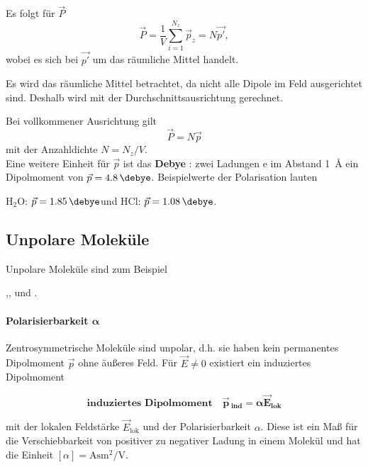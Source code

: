 
    Es folgt für $\vec{P}$
    \begin{equation}
    	\label{2.5}
    	\vec{P} = \frac{1}{V} \sum_{i = 1}^{N_{z}} \vec{p}_{z}= N \vec{p'},
    \end{equation}
    wobei es sich bei $\vec{p'}$ um das räumliche Mittel handelt.
    \begin{verbal}
        Es wird das räumliche Mittel betrachtet, da nicht alle Dipole im Feld ausgerichtet sind. Deshalb wird mit der Durchschnittsausrichtung gerechnet.
    \end{verbal}
    Bei vollkommener Ausrichtung gilt
    \begin{equation}
    	\vec{P} = N \vec{p}
    \end{equation}
    mit der Anzahldichte $N = N_{z}/V$.\\
    
    Eine weitere Einheit für $\vec{p}$ ist das \textbf{Debye} \si{\debye}: zwei Ladungen e im Abstand \SI{1}{\angstrom} ein Dipolmoment von $ \vec{p} = \SI{4,8}{\debye}$. Beispielwerte der Polarisation lauten
    \begin{center}
        H${}_2$O: $\vec p=\SI{1,85}{\debye}$\quad und \quad HCl: $\vec p=\SI{1,08}{\debye}$.
    \end{center}
    \subsection{Unpolare Moleküle}
    Unpolare Moleküle sind zum Beispiel
    \begin{center}
    	,\qquad {},\qquad {} \qquad und \qquad{}.
    \end{center}

\paragraph{Polarisierbarkeit $\bm\alpha$}
    Zentrosymmetrische Moleküle sind unpolar, d.h. sie haben kein permanentes Dipolmoment $\vec{p}$ ohne äußeres Feld. Für $\vec{E} \neq 0$ existiert ein induziertes Dipolmoment

    \begin{important}
        \begin{equation}
            \textbf{induziertes Dipolmoment}\quad
        	\bm{\vec{p}\,_{\textbf{ind}} = \alpha \vec{E}_{\textbf{lok}}}
        \end{equation}
    \end{important}
    mit der lokalen Feldstärke $\vec{E}_{\text{lok}}$ und der {Polarisierbarkeit} $\alpha$. Diese ist ein Maß für die Verschiebbarkeit von positiver zu negativer Ladung in einem Molekül und hat die Einheit $\left[ \alpha \right] = \si{\ampere \second \meter \squared  \per \volt}$.\\
    
